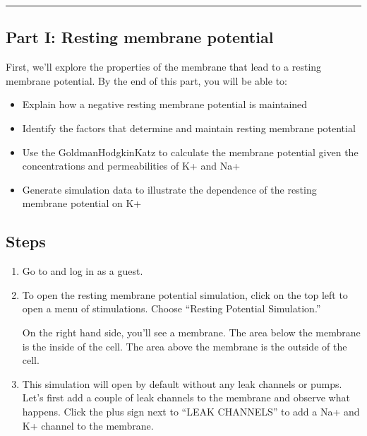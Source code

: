 \documentclass[letterpaper,10pt,english]{jupyterBook}
\begin{document}
\bigskip\hrule\bigskip



\subsection{Part I: Resting membrane potential}
\label{\detokenize{ModelingNeuralMembranes:part-i-resting-membrane-potential}}
\sphinxAtStartPar
First, we’ll explore the properties of the membrane that lead to a resting membrane potential. By the end of this part, you will be able to:
\begin{itemize}
\item {} 
\sphinxAtStartPar
Explain how a negative resting membrane potential is maintained

\item {} 
\sphinxAtStartPar
Identify the factors that determine and maintain resting membrane potential

\item {} 
\sphinxAtStartPar
Use the Goldman\sphinxhyphen{}Hodgkin\sphinxhyphen{}Katz to calculate the membrane potential given the concentrations and permeabilities of K+ and Na+

\item {} 
\sphinxAtStartPar
Generate simulation data to illustrate the dependence of the resting membrane potential on K+

\end{itemize}


\subsection{Steps}
\label{\detokenize{ModelingNeuralMembranes:steps}}\begin{enumerate}
%
\item {} 
\sphinxAtStartPar
Go to  and log in as a guest.

\item {} 
\sphinxAtStartPar
To open the resting membrane potential simulation, click on the top left to open a menu of stimulations. Choose “Resting Potential Simulation.”

\sphinxAtStartPar
On the right hand side, you’ll see a membrane. The area below the membrane is the inside of the cell. The area above the membrane is the outside of the cell.

\item {} 
\sphinxAtStartPar
This simulation will open by default without any leak channels or pumps. Let’s first add a couple of leak channels to the membrane and observe what happens. Click the plus sign next to “LEAK CHANNELS” to add a Na+ and K+ channel to the membrane.

\end{enumerate}
\end{document}
